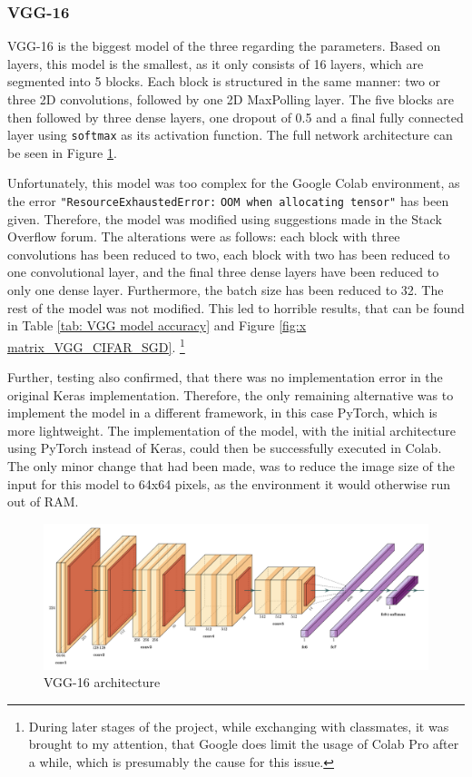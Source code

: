 \documentclass[conference]{IEEEtran}
\begin{document}
\subsubsection{VGG-16}
VGG-16 is the biggest model of the three regarding the parameters. 
Based on layers, this model is the smallest, as it only consists of 16 layers, which are segmented into 5 blocks. 
Each block is structured in the same manner: two or three 2D convolutions, followed by one 2D MaxPolling layer. 
The five blocks are then followed by three dense layers, one dropout of 0.5 and a final fully connected layer using \verb|softmax| as its activation function. 
The full network architecture can be seen in Figure \ref{fig:x VGG architecture}. \cite{simonyan_very_2015}

Unfortunately, this model was too complex for the Google Colab environment, as the error \verb|"ResourceExhaustedError:| \verb|OOM when allocating tensor"| has been given. Therefore, the model was modified using suggestions made in the Stack Overflow forum. \cite{gervais_answer_2019}
The alterations were as follows: each block with three convolutions has been reduced to two, each block with two has been reduced to one convolutional layer, and the final three dense layers have been reduced to only one dense layer. Furthermore, the batch size has been reduced to 32. 
The rest of the model was not modified. This led to horrible results, that can be found in Table \ref{tab: VGG model accuracy} and Figure \ref{fig:x matrix_VGG_CIFAR_SGD}. \footnote{During later stages of the project, while exchanging with classmates, it was brought to my attention, that Google  does limit the usage of Colab Pro after a while, which is presumably the cause for this issue. }

Further, testing also confirmed, that there was no implementation error in the original Keras implementation. 
Therefore, the only remaining alternative was to implement the model in a different framework, in this case PyTorch, which is more lightweight.
The implementation of the model, with the initial architecture using PyTorch instead of Keras,  could then be successfully executed in Colab. 
The only minor change that had been made, was to reduce the image size of the input for this model to 64x64 pixels, as the environment it would otherwise run out of RAM.

\begin{figure}[!htbp]
    \centering
    \includegraphics[scale=0.07]{img/VGG.png}
    \caption{VGG-16 architecture \cite{noauthor_forks_nodate}}
    \label{fig:x VGG architecture}
\end{figure}
\end{document}
